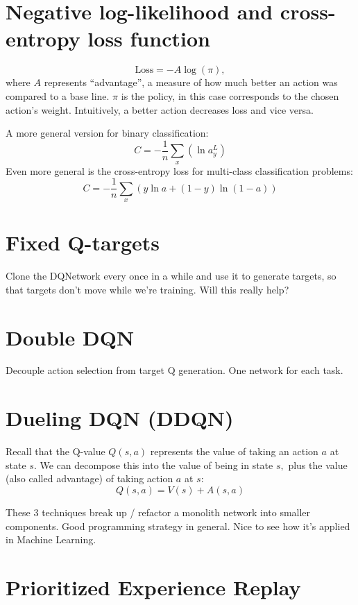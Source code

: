 \documentclass[12pt]{article}
\theoremstyle{plain}
\theoremstyle{definition}
\theoremstyle{remark}
\begin{document}
\section{Negative log-likelihood and cross-entropy loss function}

\[
\text{Loss} = - A \log(\pi),
\]
where \( A \) represents ``advantage'', a measure of how much better an action was
compared to a base line. \( \pi \) is the policy, in this case corresponds to
the chosen action's weight. Intuitively, a better action decreases loss and vice
versa.

A more general version for binary classification:
\[
C = - \frac { 1 } { n } \sum _ { x } \left( \ln a _ { y } ^ { L } \right)
\]
Even more general is the cross-entropy loss for multi-class classification problems:
\[
C = - \frac { 1 } { n } \sum _ { x } ( y \ln a + ( 1 - y ) \ln ( 1 - a ) )
\]

\section{Fixed Q-targets}

Clone the DQNetwork every once in a while and use it to generate targets, so that targets don't move while we're training. Will this really help?

\section{Double DQN}

Decouple action selection from target Q generation. One network for each task.

\section{Dueling DQN (DDQN)}

Recall that the Q-value $ Q(s, a) $ represents the value of taking an action $ a
$ at state $ s. $ We can decompose this into the value of being in state $ s, $
plus the value (also called advantage) of taking action $ a $ at $ s: $ $$
  Q(s, a) = V(s) + A(s, a)
$$

These 3 techniques break up / refactor a monolith network into smaller components. Good programming strategy in general. Nice to see how it's applied in Machine Learning.

\section{Prioritized Experience Replay}
\end{document}
